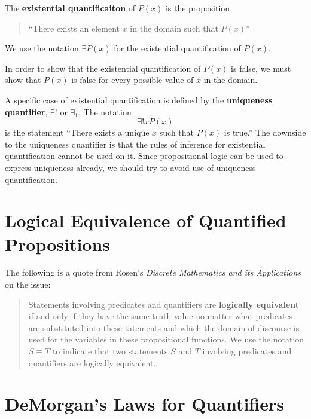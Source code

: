\begin{defn}
  The \textbf{existential quantificaiton} of $P(x)$ is the proposition
  \begin{quote}
    ``There exists an element $x$ in the domain such that $P(x)$''
  \end{quote}
  We use the notation $\exists P(x)$ for the existential quantification of
  $P(x)$.\cite[p.~42]{rosen}
\end{defn}

In order to show that the existential quantification of $P(x)$ is false, we must
show that $P(x)$ is false for every possible value of $x$ in the domain.

A specific case of existential quantification is defined by the
\textbf{uniqueness quantifier}, $\exists!$ or $\exists_1$. The notation
\[ \exists! x P(x) \]
is the statement ``There exists a unique $x$ such that $P(x)$ is true.'' The
downside to the uniqueness quantifier is that the rules of inference for
existential quantification cannot be used on it. Since propositional logic can
be used to express uniqueness already, we should try to avoid use of uniqueness
quantification.

\section{Logical Equivalence of Quantified Propositions}

The following is a quote from Rosen's \emph{Discrete Mathematics and its Applications} on the issue:

\begin{quote}
  Statements involving predicates and quantifiers are \textbf{logically
  equivalent} if and only if they have the same truth value no matter what
  predicates are substituted into these tatements and which the domain of
  discourse is used for the variables in these propositional functions. We use the
  notation $S \equiv T$ to indicate that two statements $S$ and $T$ involving
  predicates and quantifiers are logically equivalent.

  \hfill\cite[p.~45]{rosen}
\end{quote}

\section{DeMorgan's Laws for Quantifiers}


